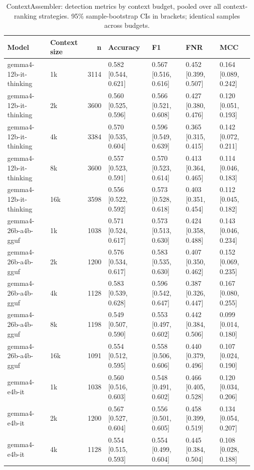 \begin{table}
\caption{ContextAssembler: detection metrics by context budget, pooled over all context-ranking strategies. 95\% sample-bootstrap CIs in brackets; identical samples across budgets.}
\label{tab:context_size_budget_sweep}
\begin{tabular}{llrllll}
\toprule
Model & Context size & n & Accuracy & F1 & FNR & MCC \\
\midrule
gemma4-12b-it-thinking & 1k & 3114 & 0.582 [0.544, 0.621] & 0.567 [0.516, 0.616] & 0.452 [0.399, 0.507] & 0.164 [0.089, 0.242] \\
gemma4-12b-it-thinking & 2k & 3600 & 0.560 [0.525, 0.596] & 0.566 [0.521, 0.608] & 0.427 [0.380, 0.476] & 0.120 [0.051, 0.193] \\
gemma4-12b-it-thinking & 4k & 3384 & 0.570 [0.535, 0.604] & 0.596 [0.549, 0.639] & 0.365 [0.315, 0.415] & 0.142 [0.072, 0.211] \\
gemma4-12b-it-thinking & 8k & 3600 & 0.557 [0.523, 0.591] & 0.570 [0.523, 0.614] & 0.413 [0.364, 0.465] & 0.114 [0.046, 0.183] \\
gemma4-12b-it-thinking & 16k & 3598 & 0.556 [0.522, 0.592] & 0.573 [0.528, 0.618] & 0.403 [0.351, 0.454] & 0.112 [0.045, 0.182] \\
gemma4-26b-a4b-gguf & 1k & 1038 & 0.571 [0.524, 0.617] & 0.573 [0.513, 0.630] & 0.424 [0.358, 0.488] & 0.143 [0.046, 0.234] \\
gemma4-26b-a4b-gguf & 2k & 1200 & 0.576 [0.534, 0.617] & 0.583 [0.535, 0.630] & 0.407 [0.350, 0.462] & 0.152 [0.069, 0.235] \\
gemma4-26b-a4b-gguf & 4k & 1128 & 0.583 [0.539, 0.628] & 0.596 [0.542, 0.647] & 0.387 [0.326, 0.447] & 0.167 [0.080, 0.255] \\
gemma4-26b-a4b-gguf & 8k & 1198 & 0.549 [0.507, 0.590] & 0.553 [0.497, 0.602] & 0.442 [0.384, 0.506] & 0.099 [0.014, 0.180] \\
gemma4-26b-a4b-gguf & 16k & 1091 & 0.554 [0.512, 0.595] & 0.558 [0.506, 0.606] & 0.440 [0.379, 0.496] & 0.107 [0.024, 0.190] \\
gemma4-e4b-it & 1k & 1038 & 0.560 [0.516, 0.603] & 0.548 [0.491, 0.602] & 0.466 [0.405, 0.528] & 0.120 [0.034, 0.206] \\
gemma4-e4b-it & 2k & 1200 & 0.567 [0.527, 0.604] & 0.556 [0.501, 0.605] & 0.458 [0.399, 0.519] & 0.134 [0.054, 0.207] \\
gemma4-e4b-it & 4k & 1128 & 0.554 [0.515, 0.593] & 0.554 [0.499, 0.604] & 0.445 [0.384, 0.504] & 0.108 [0.028, 0.188] \\

\end{tabular}
\end{table}
